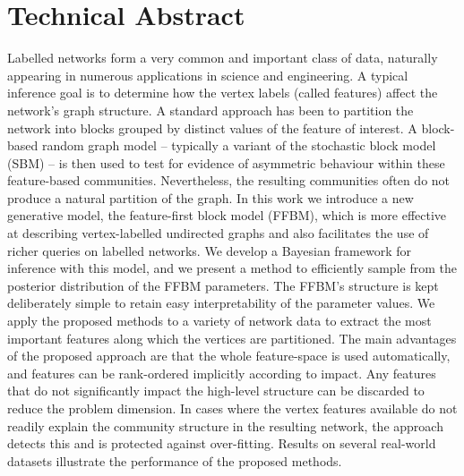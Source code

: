 \section*{Technical Abstract}
	Labelled networks form a very common and important class of data,
	naturally appearing in numerous applications in science and engineering.
	A typical inference goal is to determine how the vertex labels
	(called features) affect the network's graph structure. A standard
	approach has been to partition the network into blocks grouped
	by distinct values of the feature of interest. A block-based random
	graph model -- typically a variant of the stochastic block model (SBM) --
	is then used to test for evidence of asymmetric behaviour within these
	feature-based communities. Nevertheless, the resulting communities
	often do not produce a natural partition of the graph. In this work
	we introduce a new generative model, the feature-first block model (FFBM),
	which is more effective at describing vertex-labelled undirected
	graphs and also facilitates the use of richer queries on labelled networks.
	We develop a Bayesian framework for inference with this model,
	and we present a method to efficiently sample from the posterior
	distribution of the FFBM parameters. The FFBM's structure is kept
	deliberately simple to retain easy interpretability of the parameter
	values. We apply the proposed methods to a variety of network data
	to extract the most important features along which the vertices
	are partitioned. The main advantages of the proposed approach are
	that the whole feature-space is used automatically, and features
	can be rank-ordered implicitly according to impact. Any features
	that do not significantly impact the high-level structure can be
	discarded to reduce the problem dimension. In cases where the vertex
	features available do not readily explain the community structure
	in the resulting network, the approach detects this and is protected
	against over-fitting. Results on several real-world datasets
	illustrate the performance of the proposed methods. 